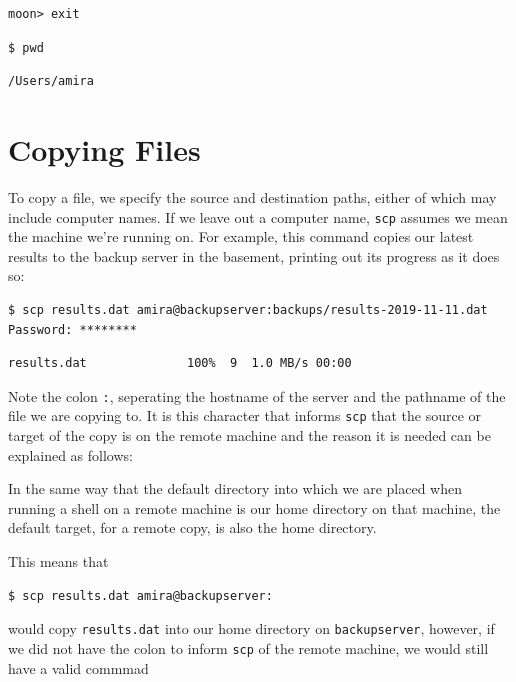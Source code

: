 \documentclass[
]{krantz}
\begin{document}
\begin{verbatim}
moon> exit
\end{verbatim}

\begin{verbatim}
$ pwd
\end{verbatim}

\begin{verbatim}
/Users/amira
\end{verbatim}

\hypertarget{ssh-cp}{%
\section{Copying Files}\label{ssh-cp}}

To copy a file,
we specify the source and destination paths,
either of which may include computer names.
If we leave out a computer name,
\texttt{scp} assumes we mean the machine we're running on.
For example,
this command copies our latest results to the backup server in the basement,
printing out its progress as it does so:

\begin{verbatim}
$ scp results.dat amira@backupserver:backups/results-2019-11-11.dat
Password: ********
\end{verbatim}

\begin{verbatim}
results.dat              100%  9  1.0 MB/s 00:00
\end{verbatim}

Note the colon \texttt{:}, seperating the hostname of the server and the pathname of
the file we are copying to.
It is this character that informs \texttt{scp} that the source or target of the copy is
on the remote machine and the reason it is needed can be explained as follows:

In the same way that the default directory into which we are placed when running
a shell on a remote machine is our home directory on that machine, the default
target, for a remote copy, is also the home directory.

This means that

\begin{verbatim}
$ scp results.dat amira@backupserver:
\end{verbatim}

would copy \texttt{results.dat} into our home directory on \texttt{backupserver}, however, if we did not
have the colon to inform \texttt{scp} of the remote machine, we would still have a valid commmad
\end{document}
